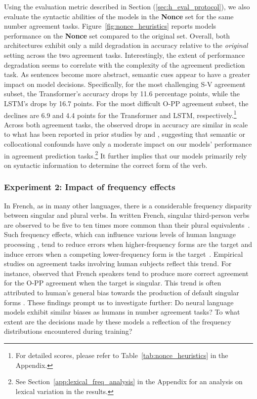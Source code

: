 Using the evaluation metric described in Section (\textsection\ref{sec:h_eval_protocol}), we also evaluate the syntactic abilities of the models in the \textbf{Nonce} set for the same number agreement tasks. Figure~\ref{fig:nonce_heuristics} reports models performance on the \textbf{Nonce} set compared to the original set. Overall, both architectures exhibit only a mild degradation in accuracy relative to
the \emph{original} setting across the two agreement tasks. Interestingly, the extent of performance degradation seems to correlate with the complexity of the agreement prediction task. As sentences become more abstract, semantic cues appear to have a greater impact on model decisions. Specifically, for the most challenging S-V agreement subset, the Transformer's accuracy drops by 11.6 percentage points, while the LSTM's drops by 16.7 points. For the most difficult O-PP agreement subset, 
the declines are 6.9 and 4.4 points for the Transformer and LSTM, respectively.\footnote{For detailed scores, please refer to Table~\ref{tab:nonce_heuristics} in the Appendix.} Across both agreement tasks, the observed drops in accuracy are similar in scale to what has been reported in prior studies by \cite{gulordava-etal-2018-colorless} and \cite{goldberg19assessing}, suggesting that semantic or collocational confounds have only a moderate impact on our models' performance in agreement prediction tasks.\footnote{See Section~\ref{app:lexical_freq_analysis} in the Appendix for an analysis on lexical variation in the results.}  It further implies that our models primarily rely on syntactic information to determine the correct form of the verb.


\subsubsection{Experiment 2: Impact of frequency effects} %
\label{sec:freq_effects}

In French, as in many other languages, there is a considerable frequency disparity between singular and plural verbs. In written French, singular third-person verbs are observed to be five to ten times more common than their plural equivalents~\citep{aagren2013input}. Such frequency effects, which can influence various levels of human language processing \citep{marantz2013words}, tend to reduce errors when higher-frequency forms are the target and induce errors when a competing lower-frequency form is the target~\citep{ambridge2015ubiquity}. Empirical studies on agreement tasks involving human subjects reflect this trend. For instance, \cite{villata2017intervention} observed that French speakers tend to produce more correct agreement for the O-PP agreement when the target is singular. This trend is often attributed to human's general bias towards the production of default singular forms \citep{greenberg1963some,corbett2000gender}. These findings prompt us to investigate further: Do neural language models exhibit similar biases as humans in number agreement tasks? To what extent are the decisions made by these models a reflection of the frequency distributions encountered during training?


